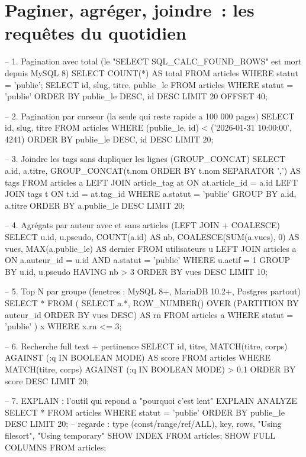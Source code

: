 \section{Paginer, agr\'eger, joindre~: les requ\^etes du quotidien}

\begin{codesql}
-- 1. Pagination avec total (le "SELECT SQL_CALC_FOUND_ROWS" est mort depuis MySQL 8)
SELECT COUNT(*) AS total FROM articles WHERE statut = 'publie';
SELECT id, slug, titre, publie_le FROM articles
WHERE statut = 'publie'
ORDER BY publie_le DESC, id DESC
LIMIT 20 OFFSET 40;

-- 2. Pagination par curseur (la seule qui reste rapide a 100 000 pages)
SELECT id, slug, titre FROM articles
WHERE (publie_le, id) < ('2026-01-31 10:00:00', 4241)
ORDER BY publie_le DESC, id DESC LIMIT 20;

-- 3. Joindre les tags sans dupliquer les lignes (GROUP_CONCAT)
SELECT a.id, a.titre, GROUP_CONCAT(t.nom ORDER BY t.nom SEPARATOR ',') AS tags
FROM articles a
LEFT JOIN article_tag at ON at.article_id = a.id
LEFT JOIN tags t ON t.id = at.tag_id
WHERE a.statut = 'publie'
GROUP BY a.id, a.titre
ORDER BY a.publie_le DESC
LIMIT 20;

-- 4. Agr\'egats par auteur avec et sans articles (LEFT JOIN + COALESCE)
SELECT u.id, u.pseudo,
       COUNT(a.id) AS nb,
       COALESCE(SUM(a.vues), 0) AS vues,
       MAX(a.publie_le) AS dernier
FROM utilisateurs u
LEFT JOIN articles a ON a.auteur_id = u.id AND a.statut = 'publie'
WHERE u.actif = 1
GROUP BY u.id, u.pseudo
HAVING nb > 3
ORDER BY vues DESC
LIMIT 10;

-- 5. Top N par groupe (fenetres : MySQL 8+, MariaDB 10.2+, Postgres partout)
SELECT * FROM (
  SELECT a.*, ROW_NUMBER() OVER (PARTITION BY auteur_id ORDER BY vues DESC) AS rn
  FROM articles a WHERE statut = 'publie'
) x WHERE x.rn <= 3;

-- 6. Recherche full text + pertinence
SELECT id, titre, MATCH(titre, corps) AGAINST (:q IN BOOLEAN MODE) AS score
FROM articles WHERE MATCH(titre, corps) AGAINST (:q IN BOOLEAN MODE) > 0.1
ORDER BY score DESC LIMIT 20;

-- 7. EXPLAIN : l'outil qui repond a "pourquoi c'est lent"
EXPLAIN ANALYZE SELECT * FROM articles WHERE statut = 'publie' ORDER BY publie_le DESC LIMIT 20;
-- regarde : type (const/range/ref/ALL), key, rows, "Using filesort", "Using temporary"
SHOW INDEX FROM articles; SHOW FULL COLUMNS FROM articles;
\end{codesql}

